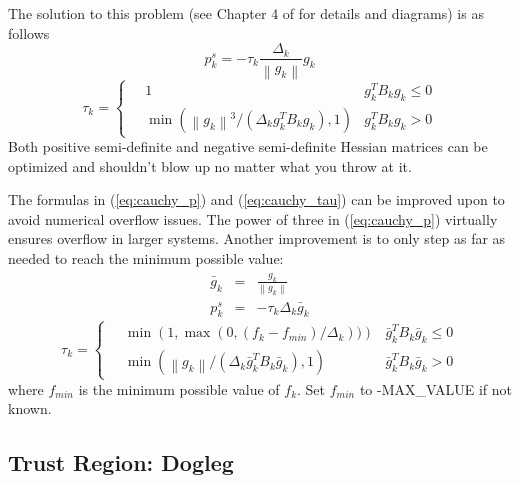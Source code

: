\documentclass[peerreview,onecolumn]{IEEEtran}
\newcommand{\norm}[1]{\left\lVert#1\right\rVert}
\begin{document}
The solution to this problem (see Chapter 4 of \cite{numopt2006} for details and diagrams) is as follows
\begin{equation}
p^s_k = -\tau_k \frac{\Delta_k}{\norm{g_k}}g_k
\label{eq:cauchy_p}
\end{equation}
\begin{equation}
\tau_k = 
	\begin{cases}
		\quad 1 & g_k^T B_k g_k \le 0 \\
		\quad \min\left(\norm{g_k}^3/(\Delta_k g_k^T B_k g_k),1\right) & g_k^T B_k g_k > 0
	\end{cases}
	\label{eq:cauchy_tau}
\end{equation}
Both positive semi-definite and negative semi-definite Hessian matrices can be optimized and shouldn't blow up no matter what you throw at it.

The formulas in (\ref{eq:cauchy_p}) and (\ref{eq:cauchy_tau}) can be improved upon to avoid numerical overflow issues. The power of three in (\ref{eq:cauchy_p}) virtually ensures overflow in larger systems. Another improvement is to only step as far as needed to reach the minimum possible value:
\begin{eqnarray}
\bar{g}_k &=& \frac{g_k}{\norm{g_k}} \\
p^s_k &=& -\tau_k \Delta_k \bar{g}_k
\end{eqnarray}
\begin{equation}
\tau_k = \begin{cases}
		\quad \min\left(1, \max(0,(f_k-f_{min})/\Delta_k)) \right) & \bar{g}_k^T B_k \bar{g}_k\le 0 \\
		\quad \min\left(\norm{g_k}/(\Delta_k \bar{g}_k^T B_k \bar{g}_k),1\right) & \bar{g}_k^T B_k \bar{g}_k > 0
	\end{cases}
\end{equation}
where $f_{min}$ is the minimum possible value of $f_k$. Set $f_{min}$ to -MAX\_VALUE if not known.


\subsection{Trust Region: Dogleg} 
\end{document}

